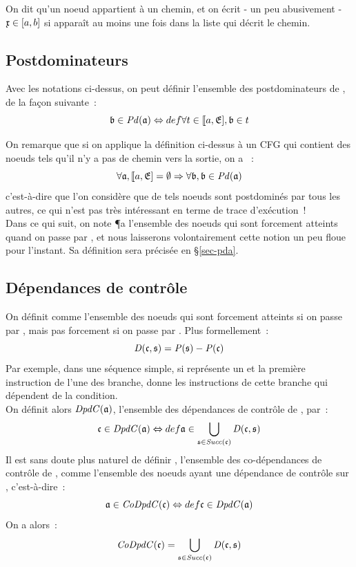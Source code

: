 On dit qu'un noeud appartient à un chemin, et on écrit - un peu abusivement -
$\mathfrak{x} \in [a, b]$ si  apparaît au moins une fois
dans la liste qui décrit le chemin.

\subsection{Postdominateurs}

Avec les notations ci-dessus,
on peut définir  l'ensemble des postdominateurs de ,
de la façon suivante~:
$$
  \mathfrak{b} \in \mathit{Pd}(\mathfrak{a}) \Leftrightarrow{def} \forall t \in \llbracket a, \mathfrak{E}], \mathfrak{b} \in t
$$

On remarque que si on applique la définition ci-dessus à un CFG
qui contient des noeuds tels qu'il n'y a pas de chemin vers la sortie,
on a ~:
$$
\forall \mathfrak{a}, \llbracket a, \mathfrak{E}] = \emptyset \Rightarrow \forall \mathfrak{b}, \mathfrak{b} \in \mathit{Pd}(\mathfrak{a})
$$
c'est-à-dire que l'on considère que de tels noeuds sont postdominés par tous les
autres, ce qui n'est pas très intéressant en terme de trace d'exécution~!\\

Dans ce qui suit, on note \P{a} l'ensemble des noeuds qui sont forcement
atteints quand on passe par ,
et nous laisserons volontairement cette notion
un peu floue pour l'instant. Sa définition sera précisée en \S\ref{sec-pda}.

\subsection{Dépendances de contrôle} \label{sec-dpdc-if}

On définit  comme
l'ensemble des noeuds qui sont forcement atteints si on passe par
, mais pas forcement si on passe par .
Plus formellement~:
$$
\mathit{D}(\mathfrak{c},\mathfrak{s}) = \mathit{P}(\mathfrak{s}) - \mathit{P}(\mathfrak{c})
$$
Par exemple, dans une séquence simple, si  représente un
 et  la première instruction de l'une des branche, 
donne les instructions de cette branche qui dépendent de la condition.\\

On définit alors $\mathit{DpdC}(\mathfrak{a})$,
l'ensemble des dépendances de contrôle de , par~:
$$
\mathfrak{c} \in \mathit{DpdC}(\mathfrak{a}) \Leftrightarrow{def} \mathfrak{a} \in \bigcup_{ \mathfrak{s} \in \mathit{Succ}(\mathfrak{c})} \mathit{D}(\mathfrak{c},\mathfrak{s})
$$
Il est sans doute plus naturel de définir ,
l'ensemble des co-dépendances de contrôle de ,
comme l'ensemble des noeuds ayant une dépendance de contrôle sur ,
c'est-à-dire~:
$$
  \mathfrak{a} \in \mathit{CoDpdC}(\mathfrak{c}) \Leftrightarrow{def} \mathfrak{c} \in \mathit{DpdC}(\mathfrak{a})
$$
On a alors~:
$$
\mathit{CoDpdC}(\mathfrak{c}) = \bigcup_{ \mathfrak{s} \in \mathit{Succ}(\mathfrak{c})}  \mathit{D}(\mathfrak{c},\mathfrak{s})
$$


